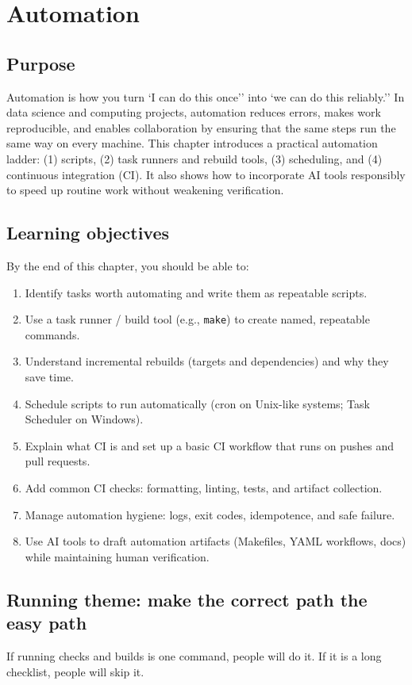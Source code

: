\chapter{Automation}
\label{ch:automation}

\section*{Purpose}
Automation is how you turn `I can do this once'' into `we can do this reliably.'' In data science and computing projects, automation reduces errors, makes work reproducible, and enables collaboration by ensuring that the same steps run the same way on every machine. This chapter introduces a practical automation ladder: (1) scripts, (2) task runners and rebuild tools, (3) scheduling, and (4) continuous integration (CI). It also shows how to incorporate AI tools responsibly to speed up routine work without weakening verification.

\section*{Learning objectives}
By the end of this chapter, you should be able to:
\begin{enumerate}
\item Identify tasks worth automating and write them as repeatable scripts.
\item Use a task runner / build tool (e.g., \texttt{make}) to create named, repeatable commands.
\item Understand incremental rebuilds (targets and dependencies) and why they save time.
\item Schedule scripts to run automatically (cron on Unix-like systems; Task Scheduler on Windows).
\item Explain what CI is and set up a basic CI workflow that runs on pushes and pull requests.
\item Add common CI checks: formatting, linting, tests, and artifact collection.
\item Manage automation hygiene: logs, exit codes, idempotence, and safe failure.
\item Use AI tools to draft automation artifacts (Makefiles, YAML workflows, docs) while maintaining human verification.
\end{enumerate}

\section*{Running theme: make the correct path the easy path}
If running checks and builds is one command, people will do it. If it is a long checklist, people will skip it.

